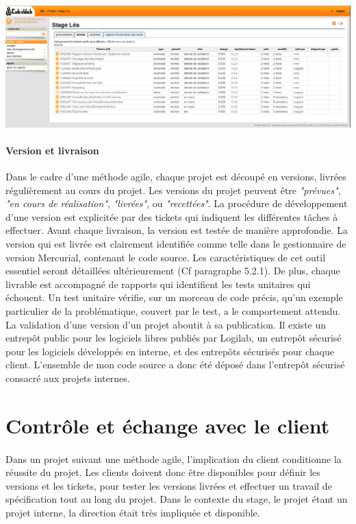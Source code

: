 \documentclass {report}
\begin{document}
\begin{center}
\includegraphics[scale=0.5]{ticket.png}
\end{center}

\paragraph{Version et livraison}
Dans le cadre d'une méthode agile, chaque projet est découpé en versions, livrées régulièrement au cours du projet. Les versions du projet peuvent être \textit{"prévues"}, \textit{"en cours de réalisation"}, \textit{"livrées"}, ou \textit{"recettées"}. La procédure de développement d'une version est explicitée par des tickets qui indiquent les différentes tâches à effectuer. Avant chaque livraison, la version est testée de manière approfondie. La version qui est livrée est clairement identifiée comme telle dans le gestionnaire de version Mercurial, contenant le code source. Les caractéristiques de cet outil essentiel seront détaillées ultérieurement (Cf paragraphe 5.2.1). De plus, chaque livrable est accompagné de rapports qui identifient les tests unitaires qui échouent. Un test unitaire vérifie, sur un morceau de code précis, qu'un exemple particulier de la problématique, couvert par le test, a le comportement attendu. La validation d’une version d’un projet aboutit à sa publication. Il existe un entrepôt public pour les logiciels libres publiés par Logilab, un entrepôt sécurisé pour les logiciels développés en interne, et des entrepôts sécurisés pour chaque client. L'ensemble de mon code source a donc été déposé dans l'entrepôt sécurisé consacré aux projets internes.

\section{Contrôle et échange avec le client}
\paragraph{}
Dans un projet suivant une méthode agile, l'implication du client conditionne la réussite du projet. Les clients doivent donc être disponibles pour définir les versions et les tickets, pour tester les versions livrées et effectuer un travail de spécification tout au long du projet. Dans le contexte du stage, le projet étant un projet interne, la direction était très impliquée et disponible.
\end{document}
